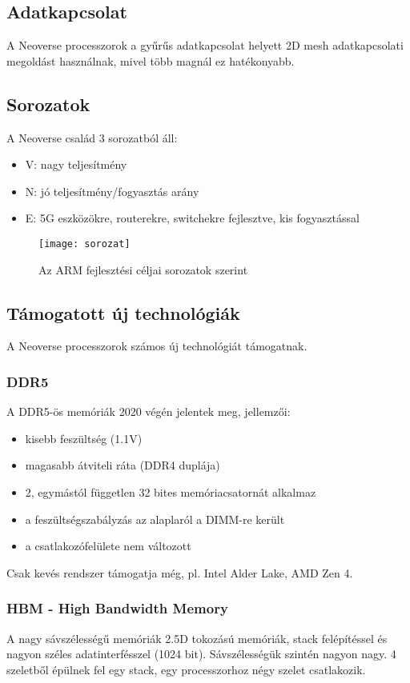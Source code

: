 \subsection{Adatkapcsolat}
A Neoverse processzorok a gyűrűs adatkapcsolat helyett 2D mesh adatkapcsolati megoldást használnak, mivel több magnál ez hatékonyabb.

\subsection{Sorozatok}
A Neoverse család 3 sorozatból áll:
\begin{itemize}
    \item V: nagy teljesítmény
    \item N: jó teljesítmény/fogyasztás arány
    \item E: 5G eszközökre, routerekre, switchekre fejlesztve, kis fogyasztással
\end{itemize}
\begin{figure}[H]
    \texttt{[image: sorozat]}
    \centering
    \caption{Az ARM fejlesztési céljai sorozatok szerint}
    \label{fig:sorozat}
\end{figure}

\subsection{Támogatott új technológiák}
A Neoverse processzorok számos új technológiát támogatnak.

\subsubsection{DDR5}
A DDR5-ös memóriák 2020 végén jelentek meg, jellemzői:
\begin{itemize}
    \item kisebb feszültség (1.1V)
    \item magasabb átviteli ráta (DDR4 duplája)
    \item 2, egymástól független 32 bites memóriacsatornát alkalmaz
    \item a feszültségszabályzás az alaplaról a DIMM-re került
    \item a csatlakozófelülete nem változott
\end{itemize}
Csak kevés rendszer támogatja még, pl. Intel Alder Lake, AMD Zen 4.

\subsubsection{HBM - High Bandwidth Memory}
A nagy sávszélességű memóriák 2.5D tokozású memóriák, stack felépítéssel és nagyon széles adatinterfésszel (1024 bit).
Sávszélességük szintén nagyon nagy.
4 szeletből épülnek fel egy stack, egy processzorhoz négy szelet csatlakozik.

